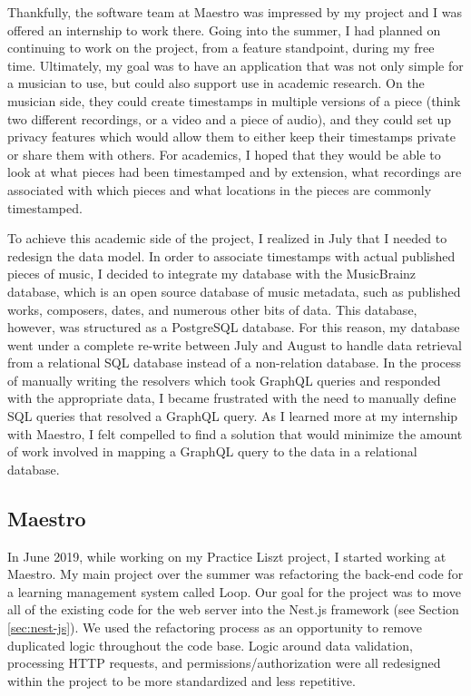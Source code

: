 Thankfully, the software team at Maestro was impressed by my project and I was offered an internship to work there. Going into the summer, I had planned on continuing to work on the project, from a feature standpoint, during my free time.  Ultimately, my goal was to have an application that was not only simple for a musician to use, but could also support use in academic research. On the musician side, they could create timestamps in multiple versions of a piece (think two different recordings, or a video and a piece of audio), and they could set up privacy features which would allow them to either keep their timestamps private or share them with others.  For academics, I hoped that they would be able to look at what pieces had been timestamped and by extension, what recordings are associated with which pieces and what locations in the pieces are commonly timestamped.

To achieve this academic side of the project, I realized in July that I needed to redesign the data model.  In order to associate timestamps with actual published pieces of music, I decided to integrate my database with the MusicBrainz database, which is an open source database of music metadata, such as published works, composers, dates, and numerous other bits of data.  This database, however, was structured as a PostgreSQL database.  For this reason, my database went under a complete re-write between July and August to handle data retrieval from a relational SQL database instead of a non-relation database.  In the process of manually writing the resolvers which took GraphQL queries and responded with the appropriate data, I became frustrated with the need to manually define SQL queries that resolved a GraphQL query.  As I learned more at my internship with Maestro, I felt compelled to find a solution that would minimize the amount of work involved in mapping a GraphQL query to the data in a relational database.

\subsection{Maestro}
In June 2019, while working on my Practice Liszt project, I started working at Maestro. My main project over the summer was refactoring the back-end code for a learning management system called Loop.  Our goal  for the project was to move all of the existing code for the web server into the Nest.js framework (see Section \ref{sec:nest-js}).  We used the refactoring process as an opportunity to remove duplicated logic throughout the code base.  Logic around data validation, processing HTTP requests, and permissions/authorization were all redesigned within the project to be more standardized and less repetitive.

